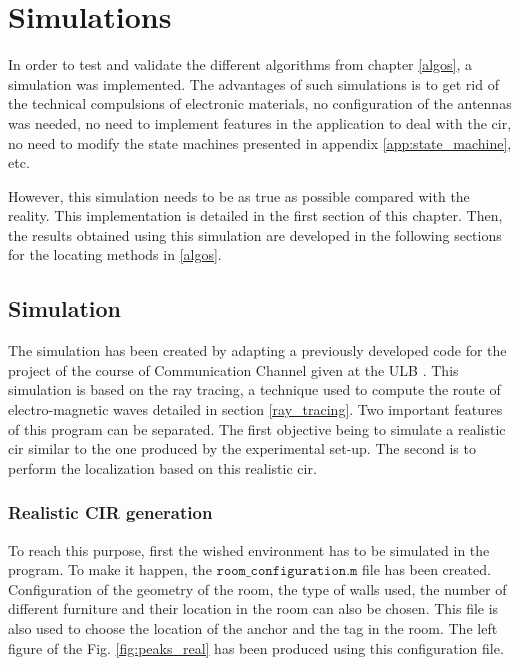 \chapter{Simulations}
\label{simulations}

In order to test and validate the different algorithms from chapter \ref{algos}, a simulation was implemented. The advantages of such simulations is to get rid of the technical compulsions of electronic materials, no configuration of the antennas was needed, no need to implement features in the application to deal with the \gls{cir}, no need to modify the state machines presented in appendix \ref{app:state_machine}, etc.
\vspace{2mm}

However, this simulation needs to be as true as possible compared with the reality. This implementation is detailed in the first section of this chapter. Then, the results obtained using this simulation are developed in the following sections for the locating methods in \ref{algos}.

\section{Simulation}

The simulation has been created by adapting a previously developed code for the project of the course of Communication Channel given at the ULB \cite{dedoncker2019course}. This simulation is based on the ray tracing, a technique used to compute the route of electro-magnetic waves detailed in section \ref{ray_tracing}. Two important features of this program can be separated. The first objective being to simulate a realistic \gls{cir} similar to the one produced by the experimental set-up. The second is to perform the localization based on this realistic \gls{cir}.
\vspace{2mm}

\subsection{Realistic CIR generation}

To reach this purpose, first the wished environment has to be simulated in the program. To make it happen, the $\texttt{room\_configuration.m}$ file has been created. Configuration of the geometry of the room, the type of walls used, the number of different furniture and their location in the room can also be chosen. This file is also used to choose the location of the anchor and the tag in the room. The left figure of the Fig. \ref{fig:peaks_real} has been produced using this configuration file.
\vspace{2mm}

